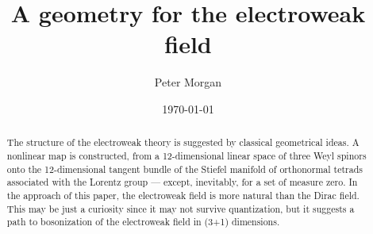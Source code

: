\documentclass[a4paper,twocolumn,showpacs,preprintnumbers,aps]{revtex4}
\begin{document}
\title{A geometry for the electroweak field}
\author{Peter Morgan}

\date{\today}
\begin{abstract}
The structure of the electroweak theory is suggested by classical
geometrical ideas. A nonlinear map is constructed,
from a 12-dimensional linear space of three Weyl spinors onto the
12-dimensional tangent bundle of the Stiefel manifold of orthonormal
tetrads associated with the Lorentz group --- except, inevitably, for a
set of measure zero. In the approach of this paper, the electroweak field
is more natural than the Dirac field. This may be just a curiosity since it
may not survive quantization, but it suggests a path to bosonization of
the electroweak field in (3+1) dimensions.
\end{abstract}

\maketitle

\newcommand\RR{{\mathrm{I\hspace{-.2em}R}}}
\newcommand\HH{{\mathrm{H\hspace{-.65em}H}}}
\newcommand\ZZ{{Z\hspace{-.45em}Z}}
\newcommand\LL{{\sqrt{(\overline{\psi}\psi)^2+(\overline{\psi}\gamma^{0123}\psi)^2}}}
\newcommand\TZ {{T\hspace{-.35em}Z}}
\end{document}
